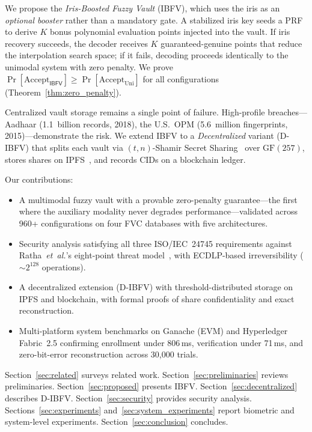 \documentclass[3p,twocolumn]{elsarticle}
\newcommand{\IBFV}{\textsf{IBFV}}
\newcommand{\DIBFV}{\textsf{D-IBFV}}
\begin{document}
We propose the \emph{Iris-Boosted Fuzzy Vault} (\IBFV{}), which uses the iris as an \emph{optional booster} rather than a mandatory gate. A stabilized iris key seeds a PRF to derive $K$ bonus polynomial evaluation points injected into the vault. If iris recovery succeeds, the decoder receives $K$ guaranteed-genuine points that reduce the interpolation search space; if it fails, decoding proceeds identically to the unimodal system with zero penalty. We prove $\Pr[\text{Accept}_{\IBFV}] \geq \Pr[\text{Accept}_{\text{Uni}}]$ for all configurations (Theorem~\ref{thm:zero_penalty}).

Centralized vault storage remains a single point of failure. High-profile breaches---Aadhaar (1.1~billion records, 2018), the U.S.\ OPM (5.6~million fingerprints, 2015)---demonstrate the risk. We extend \IBFV{} to a \emph{Decentralized} variant (\DIBFV{}) that splits each vault via $(t,n)$-Shamir Secret Sharing~\cite{shamir1979how} over $\mathrm{GF}(257)$, stores shares on IPFS~\cite{benet2014ipfs}, and records CIDs on a blockchain ledger.

Our contributions:
\begin{itemize}
    \item A multimodal fuzzy vault with a provable zero-penalty guarantee---the first where the auxiliary modality never degrades performance---validated across 960+ configurations on four FVC databases with five architectures.
    \item Security analysis satisfying all three ISO/IEC~24745 requirements against Ratha~\textit{et~al.}'s eight-point threat model~\cite{ratha2001enhancing}, with ECDLP-based irreversibility ($\sim\!2^{128}$ operations).
    \item A decentralized extension (\DIBFV{}) with threshold-distributed storage on IPFS and blockchain, with formal proofs of share confidentiality and exact reconstruction.
    \item Multi-platform system benchmarks on Ganache (EVM) and Hyperledger Fabric~2.5 confirming enrollment under 806\,ms, verification under 71\,ms, and zero-bit-error reconstruction across 30{,}000 trials.
\end{itemize}

Section~\ref{sec:related} surveys related work. Section~\ref{sec:preliminaries} reviews preliminaries. Section~\ref{sec:proposed} presents \IBFV{}. Section~\ref{sec:decentralized} describes \DIBFV{}. Section~\ref{sec:security} provides security analysis. Sections~\ref{sec:experiments} and~\ref{sec:system_experiments} report biometric and system-level experiments. Section~\ref{sec:conclusion} concludes.
\end{document}
